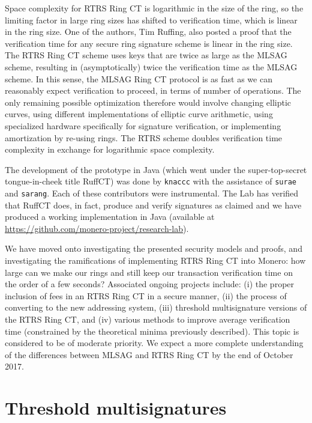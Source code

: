 \documentclass[12pt,english]{mrl}
\theoremstyle{definition}
\numberwithin{equation}{section}
\numberwithin{figure}{section}
\numberwithin{equation}{section}
\numberwithin{equation}{section}
\numberwithin{figure}{section}
\begin{document}
Space complexity for RTRS Ring CT is logarithmic in the size of the ring, so the limiting factor in large ring sizes has shifted to verification time, which is linear in the ring size. One of the authors, Tim Ruffing, also posted a proof that the verification time for any secure ring signature scheme is linear in the ring size. The RTRS Ring CT scheme uses keys that are twice as large as the MLSAG scheme, resulting in (asymptotically) twice the verification time as the MLSAG scheme. In this sense, the MLSAG Ring CT protocol is as fast as we can reasonably expect verification to proceed, in terms of number of operations. The only remaining possible optimization therefore would involve changing elliptic curves, using different implementations of elliptic curve arithmetic, using specialized hardware specifically for signature verification, or implementing amortization by re-using rings. The RTRS scheme doubles verification time complexity in exchange for logarithmic space complexity.

The development of the prototype in Java (which went under the super-top-secret tongue-in-cheek title RuffCT) was done by \texttt{knaccc} with the assistance of \texttt{surae} and \texttt{sarang}. Each of these contributors were instrumental. The Lab has verified that RuffCT does, in fact, produce and verify signatures as claimed and we have produced a working implementation in Java (available at \url{https://github.com/monero-project/research-lab}). 

We have moved onto investigating the presented security models and proofs, and investigating the ramifications of implementing RTRS Ring CT into Monero: how large can we make our rings and still keep our transaction verification time on the order of a few seconds? Associated ongoing projects include: (i) the proper inclusion of fees in an RTRS Ring CT in a secure manner, (ii) the process of converting to the new addressing system, (iii) threshold multisignature versions of the RTRS Ring CT, and (iv) various methods to improve average verification time (constrained by the theoretical minima previously described). This topic is considered to be of moderate priority. We expect a more complete understanding of the differences between MLSAG and RTRS Ring CT by the end of October 2017.








\section{Threshold multisignatures} 
\end{document}

